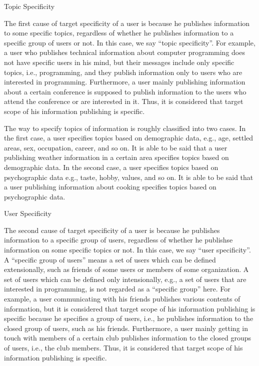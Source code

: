 \begin{description}
\bf {\item[(1)] Topic Specificity}
\label{item:Topic}
\end{description}

The first cause of target specificity of a user is because
he publishes information to some specific topics,
regardless of whether he publishes information to a specific group of
users or not.  In this case, we say ``topic specificity''.  For example,
a user who publishes technical information
about computer programming does not have specific users in his mind, but their
messages include only specific topics, i.e., programming, and they
publish information only to users who are interested in programming.
Furthermore, a user mainly
publishing information about a certain conference is supposed to publish
information to the users who attend the conference or are interested in
it.  Thus, it is considered that target scope of his
information publishing is specific.

The way to specify topics of information is roughly classified into two
cases.  In the first case, a user specifies topics based on demographic
data, e.g., age, settled areas, sex, occupation, career, and so on.  It
is able to be said that a user publishing weather information in a
certain area specifies topics based on demographic data.  In the second
case, a user specifies topics based on psychographic data e.g., taste,
hobby, values, and so on.  It is able to be said that a user
publishing information about cooking specifies topics based on
psychographic data.

\begin{description}
\bf{\item[(2)] User Specificity}
\label{item:User}
\end{description}

The second cause of target specificity of a user is because
he publishes information to a specific group of users,
regardless of whether he publishse information on some specific topics
or not.  In this case, we say ``user specificity''.
A ``specific group of users'' means a set of users which can be
defined extensionally, such as friends of some users or members of
some organization.  A set of users which can be defined only
intensionally, e.g., a set of users that are interested in
programming, is not regarded as a ``specific group'' here.
For example, a user communicating with his friends
publishes various contents of information, but it is considered that
target scope of his information publishing is specific because
he specifies a group of users, i.e., he publishes
information to the closed group of users, such as his friends.  Furthermore, a user
mainly getting in touch with members of a certain club publishes
information to the closed groups of users, i.e., the club
members.  Thus, it is considered that target scope of
his information publishing is specific.

